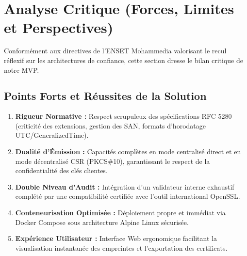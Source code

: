 \documentclass[12pt,a4paper]{report}
\begin{document}
\chapter{Analyse Critique (Forces, Limites et Perspectives)}

Conformément aux directives de l'ENSET Mohammedia valorisant le recul réflexif sur les architectures de confiance, cette section dresse le bilan critique de notre MVP.

\section{Points Forts et Réussites de la Solution}
\begin{enumerate}
    \item \textbf{Rigueur Normative :} Respect scrupuleux des spécifications RFC 5280 (criticité des extensions, gestion des SAN, formats d'horodatage UTC/GeneralizedTime).
    \item \textbf{Dualité d'Émission :} Capacités complètes en mode centralisé direct et en mode décentralisé CSR (PKCS\#10), garantissant le respect de la confidentialité des clés clientes.
    \item \textbf{Double Niveau d'Audit :} Intégration d'un validateur interne exhaustif complété par une compatibilité certifiée avec l'outil international OpenSSL.
    \item \textbf{Conteneurisation Optimisée :} Déploiement propre et immédiat via Docker Compose sous architecture Alpine Linux sécurisée.
    \item \textbf{Expérience Utilisateur :} Interface Web ergonomique facilitant la visualisation instantanée des empreintes et l'exportation des certificats.
\end{enumerate}
\end{document}

